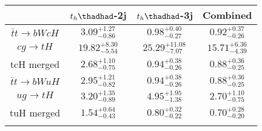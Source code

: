 \centering
\begin{tabular}{cccc} \toprule\toprule
 & $t_h\thadhad$-2j & $t_h\thadhad$-3j & Combined\\\midrule
$\bar{t}t\to bWcH$ & $3.09^{+1.27}_{-0.86}$ & $0.98^{+0.40}_{-0.27}$ & $0.92^{+0.37}_{-0.26}$\\
$cg\to tH$ & $19.82^{+8.30}_{-5.54}$ & $25.29^{+11.08}_{-7.07}$ & $15.71^{+6.36}_{-4.39}$\\
tcH merged & $2.68^{+1.10}_{-0.75}$ & $0.94^{+0.38}_{-0.26}$ & $0.88^{+0.36}_{-0.25}$\\
$\bar{t}t\to bWuH$ & $2.95^{+1.21}_{-0.82}$ & $0.94^{+0.38}_{-0.26}$ & $0.88^{+0.36}_{-0.25}$\\
$ug\to tH$ & $3.20^{+1.35}_{-0.89}$ & $4.95^{+1.95}_{-1.38}$ & $2.70^{+1.10}_{-0.75}$\\
tuH merged & $1.54^{+0.64}_{-0.43}$ & $0.80^{+0.32}_{-0.22}$ & $0.70^{+0.28}_{-0.20}$\\
\bottomrule\bottomrule\\
\end{tabular}